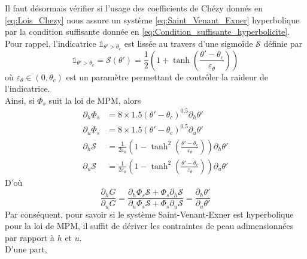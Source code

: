 \documentclass[11pt, a4paper, oneside]{report}
\begin{document}
Il faut désormais vérifier si l'usage des coefficients de Chézy donnés en \eqref{eq:Lois_Chezy} nous assure un système \eqref{eq:Saint_Venant_Exner} hyperbolique par la condition suffisante donnée en \eqref{eq:Condition_suffisante_hyperbolicite}. \\
Pour rappel, l'indicatrice $\mathds{1}_{\theta' > \theta_c}$ est lissée au travers d'une sigmoïde $\mathcal{S}$ définie par
\begin{equation}
    \mathds{1}_{\theta' > \theta_c} = \mathcal{S}(\theta') = \frac{1}{2} \left( 1 + \tanh \left( \frac{\theta' - \theta_c}{\varepsilon_\theta} \right) \right)
\end{equation}
où $\varepsilon_\theta \in (0, \theta_c)$ est un paramètre permettant de contrôler la raideur de l'indicatrice. \\
Ainsi, si $\Phi_s$ suit la loi de MPM, alors
\begin{equation}
    \begin{aligned}
        \partial_h \Phi_s & = 8 \times 1.5 (\theta' - \theta_c)^{0.5} \partial_h \theta' \\
        \partial_u \Phi_s & = 8 \times 1.5 (\theta' - \theta_c)^{0.5} \partial_u \theta' \\
        \partial_h \mathcal{S} & = \frac{1}{2 \varepsilon_\theta} \left( 1 - \tanh^2 \left( \frac{\theta' - \theta_c}{\varepsilon_\theta} \right) \right) \partial_h \theta' \\
        \partial_u \mathcal{S} & = \frac{1}{2 \varepsilon_\theta} \left( 1 - \tanh^2 \left( \frac{\theta' - \theta_c}{\varepsilon_\theta} \right) \right) \partial_u \theta'
    \end{aligned}
\end{equation}
D'où
\begin{equation}
    \frac{\partial_h G}{\partial_u G} = \frac{\partial_h \Phi_s \mathcal{S} + \Phi_s \partial_h \mathcal{S}}{\partial_u \Phi_s \mathcal{S} + \Phi_s \partial_u \mathcal{S}} = \frac{\partial_h \theta'}{\partial_u \theta'}
\end{equation}
Par conséquent, pour savoir si le système Saint-Venant-Exner est hyperbolique pour la loi de MPM, il suffit de dériver les contraintes de peau adimensionnées par rapport à $h$ et $u$. \\
D'une part,
\end{document}
